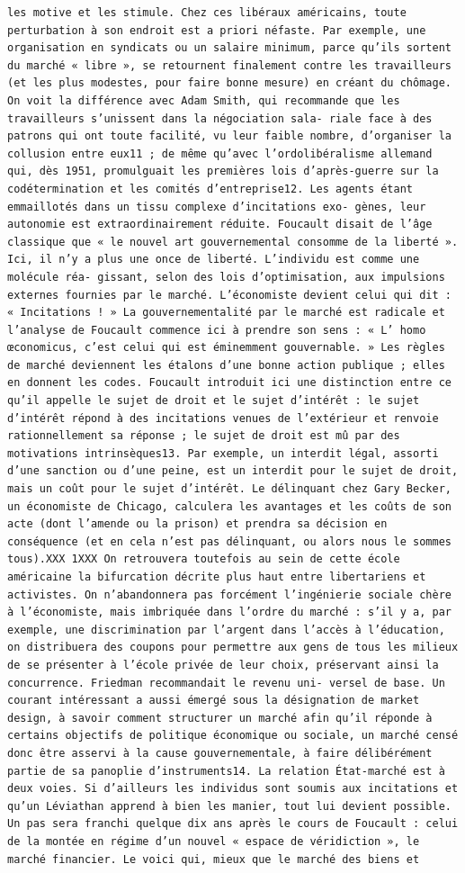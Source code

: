 \documentclass[
]{book}
\begin{document}
\begin{verbatim}
les motive et les stimule. Chez ces libéraux américains, toute perturbation à son endroit est a priori néfaste. Par exemple, une organisation en syndicats ou un salaire minimum, parce qu’ils sortent du marché « libre », se retournent finalement contre les travailleurs (et les plus modestes, pour faire bonne mesure) en créant du chômage. On voit la différence avec Adam Smith, qui recommande que les travailleurs s’unissent dans la négociation sala- riale face à des patrons qui ont toute facilité, vu leur faible nombre, d’organiser la collusion entre eux11 ; de même qu’avec l’ordolibéralisme allemand qui, dès 1951, promulguait les premières lois d’après-guerre sur la codétermination et les comités d’entreprise12. Les agents étant emmaillotés dans un tissu complexe d’incitations exo- gènes, leur autonomie est extraordinairement réduite. Foucault disait de l’âge classique que « le nouvel art gouvernemental consomme de la liberté ». Ici, il n’y a plus une once de liberté. L’individu est comme une molécule réa- gissant, selon des lois d’optimisation, aux impulsions externes fournies par le marché. L’économiste devient celui qui dit : « Incitations ! » La gouvernementalité par le marché est radicale et l’analyse de Foucault commence ici à prendre son sens : « L’ homo œconomicus, c’est celui qui est éminemment gouvernable. » Les règles de marché deviennent les étalons d’une bonne action publique ; elles en donnent les codes. Foucault introduit ici une distinction entre ce qu’il appelle le sujet de droit et le sujet d’intérêt : le sujet d’intérêt répond à des incitations venues de l’extérieur et renvoie rationnellement sa réponse ; le sujet de droit est mû par des motivations intrinsèques13. Par exemple, un interdit légal, assorti d’une sanction ou d’une peine, est un interdit pour le sujet de droit, mais un coût pour le sujet d’intérêt. Le délinquant chez Gary Becker, un économiste de Chicago, calculera les avantages et les coûts de son acte (dont l’amende ou la prison) et prendra sa décision en conséquence (et en cela n’est pas délinquant, ou alors nous le sommes tous).XXX 1XXX On retrouvera toutefois au sein de cette école américaine la bifurcation décrite plus haut entre libertariens et activistes. On n’abandonnera pas forcément l’ingénierie sociale chère à l’économiste, mais imbriquée dans l’ordre du marché : s’il y a, par exemple, une discrimination par l’argent dans l’accès à l’éducation, on distribuera des coupons pour permettre aux gens de tous les milieux de se présenter à l’école privée de leur choix, préservant ainsi la concurrence. Friedman recommandait le revenu uni- versel de base. Un courant intéressant a aussi émergé sous la désignation de market design, à savoir comment structurer un marché afin qu’il réponde à certains objectifs de politique économique ou sociale, un marché censé donc être asservi à la cause gouvernementale, à faire délibérément partie de sa panoplie d’instruments14. La relation État-marché est à deux voies. Si d’ailleurs les individus sont soumis aux incitations et qu’un Léviathan apprend à bien les manier, tout lui devient possible. Un pas sera franchi quelque dix ans après le cours de Foucault : celui de la montée en régime d’un nouvel « espace de véridiction », le marché financier. Le voici qui, mieux que le marché des biens et 
\end{verbatim}
\end{document}
